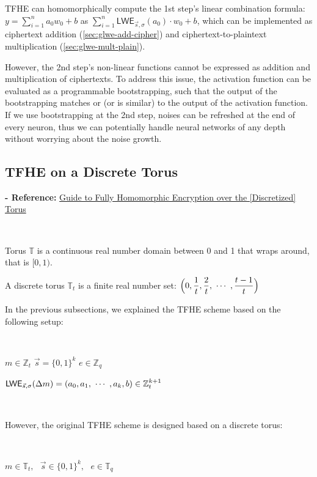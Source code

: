 TFHE can homomorphically compute the 1st step's linear combination formula: $y = \sum\limits_{i=1}^{n}a_0w_0 + b$ as $\sum\limits_{i=1}^{n}\textsf{LWE}_{\vec{s}, \sigma}(a_0) \cdot w_0 + b$, which can be implemented as ciphertext addition (\autoref{sec:glwe-add-cipher}) and ciphertext-to-plaintext multiplication (\autoref{sec:glwe-mult-plain}). 

However, the 2nd step's non-linear functions cannot be expressed as addition and multiplication of ciphertexts. To address this issue, the activation function can be evaluated as a programmable bootstrapping, such that the output of the bootstrapping matches or (or is similar) to the output of the activation function. If we use bootstrapping at the 2nd step, noises can be refreshed at the end of every neuron, thus we can potentially handle neural networks of any depth without worrying about the noise growth.



\subsection{TFHE on a Discrete Torus}
\label{subsec:torus}

\textbf{- Reference:} 
\href{https://eprint.iacr.org/2021/1402.pdf}{Guide to
Fully Homomorphic Encryption
over the [Discretized] Torus}~\cite{torus}

$ $

Torus $\mathbb{T}$ is a continuous real number domain between 0 and 1 that wraps around, that is $[0, 1)$. 

A discrete torus $\mathbb{T}_t$ is a finite real number set: $\Big(0, \dfrac{1}{t}, \dfrac{2}{t}, \text{ } \text{$\cdots$} \text{ }, \dfrac{t - 1}{t}\Big)$


In the previous subsections, we explained the TFHE scheme based on the following setup:

$ $

$m \in \mathbb{Z}_t$ 
$\vec{s} = \{0, 1\}^{k}$
$e \in \mathbb{Z}_q$

$\textsf{LWE}_{\vec{s}, \sigma}(\Delta m) = (a_0, a_1, \text{ } \text{$\cdots$} \text{ }, a_k, b) \in \mathbb{Z}_t^{k + 1}$

$ $

However, the original TFHE scheme is designed based on a discrete torus:


$ $

$m \in \mathbb{T}_{t}, \text{ } \vec{s} \in \{0, 1\}^{k}, \text{ } e \in \mathbb{T}_{q}$

$ $

